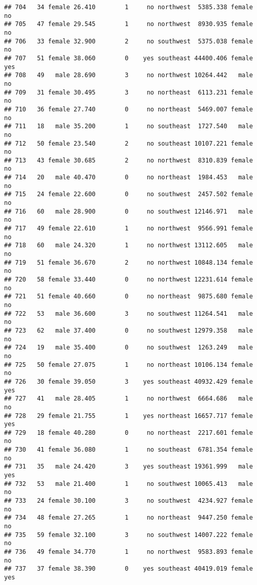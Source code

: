 \documentclass[
]{article}
\begin{document}
\begin{verbatim}
## 704   34 female 26.410        1     no northwest  5385.338 female       no
## 705   47 female 29.545        1     no northwest  8930.935 female       no
## 706   33 female 32.900        2     no southwest  5375.038 female       no
## 707   51 female 38.060        0    yes southeast 44400.406 female      yes
## 708   49   male 28.690        3     no northwest 10264.442   male       no
## 709   31 female 30.495        3     no northeast  6113.231 female       no
## 710   36 female 27.740        0     no northeast  5469.007 female       no
## 711   18   male 35.200        1     no southeast  1727.540   male       no
## 712   50 female 23.540        2     no southeast 10107.221 female       no
## 713   43 female 30.685        2     no northwest  8310.839 female       no
## 714   20   male 40.470        0     no northeast  1984.453   male       no
## 715   24 female 22.600        0     no southwest  2457.502 female       no
## 716   60   male 28.900        0     no southwest 12146.971   male       no
## 717   49 female 22.610        1     no northwest  9566.991 female       no
## 718   60   male 24.320        1     no northwest 13112.605   male       no
## 719   51 female 36.670        2     no northwest 10848.134 female       no
## 720   58 female 33.440        0     no northwest 12231.614 female       no
## 721   51 female 40.660        0     no northeast  9875.680 female       no
## 722   53   male 36.600        3     no southwest 11264.541   male       no
## 723   62   male 37.400        0     no southwest 12979.358   male       no
## 724   19   male 35.400        0     no southwest  1263.249   male       no
## 725   50 female 27.075        1     no northeast 10106.134 female       no
## 726   30 female 39.050        3    yes southeast 40932.429 female      yes
## 727   41   male 28.405        1     no northwest  6664.686   male       no
## 728   29 female 21.755        1    yes northeast 16657.717 female      yes
## 729   18 female 40.280        0     no northeast  2217.601 female       no
## 730   41 female 36.080        1     no southeast  6781.354 female       no
## 731   35   male 24.420        3    yes southeast 19361.999   male      yes
## 732   53   male 21.400        1     no southwest 10065.413   male       no
## 733   24 female 30.100        3     no southwest  4234.927 female       no
## 734   48 female 27.265        1     no northeast  9447.250 female       no
## 735   59 female 32.100        3     no southwest 14007.222 female       no
## 736   49 female 34.770        1     no northwest  9583.893 female       no
## 737   37 female 38.390        0    yes southeast 40419.019 female      yes

\end{verbatim}
\end{document}
